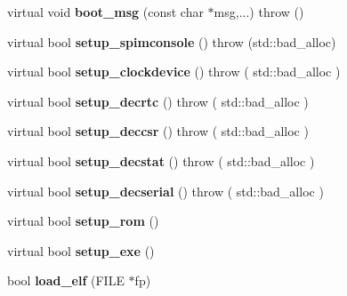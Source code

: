 \begin{DoxyCompactItemize}
\item 
\hypertarget{classvmips_a2e203897ea48f719ff7a3a1007fcf0fe}{
virtual void {\bfseries boot\_\-msg} (const char $\ast$msg,...)  throw ()}
\label{classvmips_a2e203897ea48f719ff7a3a1007fcf0fe}

\item 
\hypertarget{classvmips_ab3966b7e461c76e01e1794c2302c1264}{
virtual bool {\bfseries setup\_\-spimconsole} ()  throw (std::bad\_\-alloc)}
\label{classvmips_ab3966b7e461c76e01e1794c2302c1264}

\item 
\hypertarget{classvmips_a1690e2f7dc015006579396258fc9ec09}{
virtual bool {\bfseries setup\_\-clockdevice} ()  throw ( std::bad\_\-alloc )}
\label{classvmips_a1690e2f7dc015006579396258fc9ec09}

\item 
\hypertarget{classvmips_aaca514986ff2099e5b2749b38b5b83de}{
virtual bool {\bfseries setup\_\-decrtc} ()  throw ( std::bad\_\-alloc )}
\label{classvmips_aaca514986ff2099e5b2749b38b5b83de}

\item 
\hypertarget{classvmips_a11077bfbc7b6851733526afcd6bc0511}{
virtual bool {\bfseries setup\_\-deccsr} ()  throw ( std::bad\_\-alloc )}
\label{classvmips_a11077bfbc7b6851733526afcd6bc0511}

\item 
\hypertarget{classvmips_a064bd152d3a1a003f9190cfec219fd48}{
virtual bool {\bfseries setup\_\-decstat} ()  throw ( std::bad\_\-alloc )}
\label{classvmips_a064bd152d3a1a003f9190cfec219fd48}

\item 
\hypertarget{classvmips_a6f7b8aacf8a8ab3ff1b58f0c4e7e2450}{
virtual bool {\bfseries setup\_\-decserial} ()  throw ( std::bad\_\-alloc )}
\label{classvmips_a6f7b8aacf8a8ab3ff1b58f0c4e7e2450}

\item 
\hypertarget{classvmips_adaf982c53a952510e342b6c20f6a07fa}{
virtual bool {\bfseries setup\_\-rom} ()}
\label{classvmips_adaf982c53a952510e342b6c20f6a07fa}

\item 
\hypertarget{classvmips_affc49823a8f7c7b01313208eeab24958}{
virtual bool {\bfseries setup\_\-exe} ()}
\label{classvmips_affc49823a8f7c7b01313208eeab24958}

\item 
\hypertarget{classvmips_a1174dbe6a6e0318145c2aeaee01c4a93}{
bool {\bfseries load\_\-elf} (FILE $\ast$fp)}
\label{classvmips_a1174dbe6a6e0318145c2aeaee01c4a93}


\end{DoxyCompactItemize}
